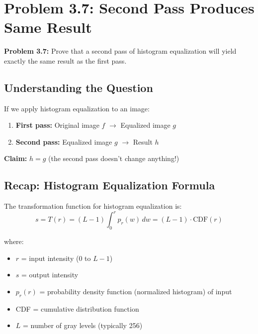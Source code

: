 \documentclass[12pt,a4paper]{article}
\begin{document}
\newpage
\section{Problem 3.7: Second Pass Produces Same Result}

\begin{questionbox}
\textbf{Problem 3.7:} Prove that a second pass of histogram equalization will yield exactly the same result as the first pass.
\end{questionbox}

\subsection{Understanding the Question}

\begin{conceptbox}
If we apply histogram equalization to an image:
\begin{enumerate}
    \item \textbf{First pass:} Original image $f$ $\rightarrow$ Equalized image $g$
    \item \textbf{Second pass:} Equalized image $g$ $\rightarrow$ Result $h$
\end{enumerate}

\textbf{Claim:} $h = g$ (the second pass doesn't change anything!)
\end{conceptbox}

\subsection{Recap: Histogram Equalization Formula}

The transformation function for histogram equalization is:
\[
s = T(r) = (L-1) \int_0^r p_r(w) \, dw = (L-1) \cdot \text{CDF}(r)
\]

where:
\begin{itemize}
    \item $r$ = input intensity (0 to $L-1$)
    \item $s$ = output intensity
    \item $p_r(r)$ = probability density function (normalized histogram) of input
    \item CDF = cumulative distribution function
    \item $L$ = number of gray levels (typically 256)
\end{itemize}
\end{document}
